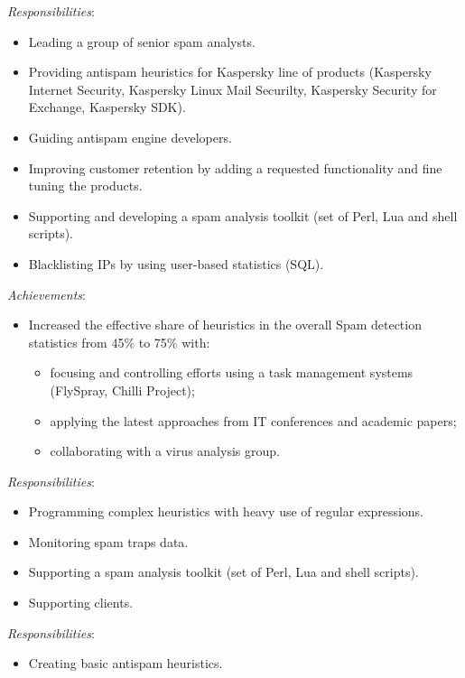 \documentclass[11pt,a4paper,sans]{moderncv}        %
\newcommand{\responsibilities}[1]{ \emph{Responsibilities}:\begin{itemize} #1\end{itemize}}
\newcommand{\achievements}[1]{ \emph{Achievements}:\begin{itemize} #1\end{itemize}}
\begin{document}
 {
    \responsibilities {
        \item Leading a group of senior spam analysts.
        \item Providing antispam heuristics for Kaspersky line of products (Kaspersky Internet Security, Kaspersky Linux Mail Securilty, Kaspersky Security for Exchange, Kaspersky SDK).
        \item Guiding antispam engine developers. %
        \item Improving customer retention by adding a requested functionality and fine tuning the products.
        \item Supporting and developing a spam analysis toolkit (set of Perl, Lua and shell scripts).
        \item Blacklisting IPs by using user-based statistics (SQL). %
    }
    \achievements {        %
        \item Increased the effective share of heuristics in the overall Spam detection statistics from 45\% to 75\% with:
        \begin{itemize}
            \item focusing and controlling efforts using a task management systems (FlySpray, Chilli Project);
            \item applying the latest approaches from IT conferences and academic papers; %
            \item collaborating with a virus analysis group.
        \end{itemize}
    }
}

 {
    \responsibilities {
        \item Programming complex heuristics with heavy use of regular expressions.
        \item Monitoring spam traps data.
        \item Supporting a spam analysis toolkit (set of Perl, Lua and shell scripts).
        \item Supporting clients.
    }
}

 {
    \responsibilities {
        \item Creating basic antispam heuristics.
    }
}
\end{document}
